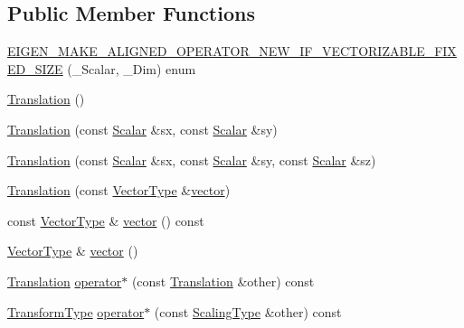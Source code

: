 \subsection*{Public Member Functions}
\begin{DoxyCompactItemize}
\item 
\hyperlink{class_translation_addf585f3497d613ea083c16b6db9af9e}{E\-I\-G\-E\-N\-\_\-\-M\-A\-K\-E\-\_\-\-A\-L\-I\-G\-N\-E\-D\-\_\-\-O\-P\-E\-R\-A\-T\-O\-R\-\_\-\-N\-E\-W\-\_\-\-I\-F\-\_\-\-V\-E\-C\-T\-O\-R\-I\-Z\-A\-B\-L\-E\-\_\-\-F\-I\-X\-E\-D\-\_\-\-S\-I\-Z\-E} (\-\_\-\-Scalar, \-\_\-\-Dim) enum
\item 
\hyperlink{class_translation_a2e4c2dc3dadbe9ebd4d4c7ae2b5a3b0f}{Translation} ()
\item 
\hyperlink{class_translation_aa20f8a0abd8f33f21da3b414db30da44}{Translation} (const \hyperlink{class_translation_a3ac09e6bdde38180bd4144846e760226}{Scalar} \&sx, const \hyperlink{class_translation_a3ac09e6bdde38180bd4144846e760226}{Scalar} \&sy)
\item 
\hyperlink{class_translation_ab0cf00e2663faea0247fcb2163e40940}{Translation} (const \hyperlink{class_translation_a3ac09e6bdde38180bd4144846e760226}{Scalar} \&sx, const \hyperlink{class_translation_a3ac09e6bdde38180bd4144846e760226}{Scalar} \&sy, const \hyperlink{class_translation_a3ac09e6bdde38180bd4144846e760226}{Scalar} \&sz)
\item 
\hyperlink{class_translation_a583a3ac9075eb178bec3fee5f8c4a21d}{Translation} (const \hyperlink{class_translation_a1b1ee9d6d92ffebecdb94e4827653ef2}{Vector\-Type} \&\hyperlink{class_translation_ad55a41e570bf9bf264b45ab796640797}{vector})
\item 
const \hyperlink{class_translation_a1b1ee9d6d92ffebecdb94e4827653ef2}{Vector\-Type} \& \hyperlink{class_translation_ad55a41e570bf9bf264b45ab796640797}{vector} () const 
\item 
\hyperlink{class_translation_a1b1ee9d6d92ffebecdb94e4827653ef2}{Vector\-Type} \& \hyperlink{class_translation_a6d10df385fa0e17d2591cd29e7c3d0d3}{vector} ()
\item 
\hyperlink{class_translation}{Translation} \hyperlink{class_translation_a8ff24a3222befed90678074452cb5394}{operator$\ast$} (const \hyperlink{class_translation}{Translation} \&other) const 
\item 
\hyperlink{class_translation_a17aa136dd5b74ba443a87887a77e6e3b}{Transform\-Type} \hyperlink{class_translation_af5190e9310689672138b6decce04b34c}{operator$\ast$} (const \hyperlink{class_translation_ae1c92ee9e56b88d3355c9551b171279f}{Scaling\-Type} \&other) const 

\end{DoxyCompactItemize}
